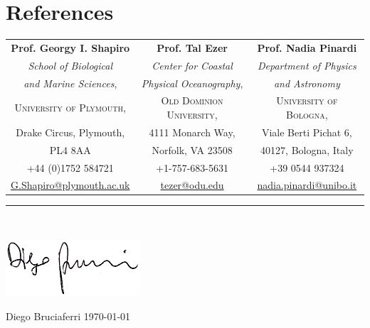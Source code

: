 \documentclass[a4paper, oneside, final]{scrartcl}
\begin{document}
\section{References}
\bigskip
\noindent
\begin{tabularx}{0.97\linewidth}{c|c|c}

\textbf{Prof. Georgy I. Shapiro}      & \textbf{Prof. Tal Ezer}            & \textbf{Prof. Nadia Pinardi}\\
\textit{School of Biological}         & \textit{Center for Coastal}        & \textit{Department of Physics} \\
\textit{and Marine Sciences},         & \textit{Physical Oceanography},    & \textit{and Astronomy} \\
\textsc{University of Plymouth},      & \textsc{Old Dominion University},  & \textsc{University of Bologna},\\
Drake Circus, Plymouth,               & 4111 Monarch Way,                  & Viale Berti Pichat 6, \\ 
PL4 8AA                               & Norfolk, VA 23508                  & 40127, Bologna, Italy \\
+44 (0)1752 584721                    & +1-757-683-5631                    & +39 0544 937324 \\
\href{mailto:G.Shapiro@plymouth.ac.uk}{G.Shapiro@plymouth.ac.uk} & \href{mailto:tezer@odu.edu}{tezer@odu.edu} & \href{mailto:nadia.pinardi@unibo.it}{nadia.pinardi@unibo.it}\\
\end{tabularx}

\begin{center}
\noindent\rule{16.2cm}{1pt}\\
\end{center}
\bigskip

\begin{flushleft}
\includegraphics[width=5cm]{./firma_Diego.png}\\
\end{flushleft}

Diego Bruciaferri \hspace{8cm} \today
\end{document}
